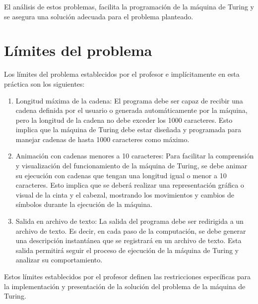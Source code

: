 El análisis de estos problemas, facilita la programación de la máquina de Turing y se asegura una solución adecuada para el problema planteado. \newline


\section{Límites del problema}%
Los límites del problema establecidos por el profesor e implícitamente en esta práctica son los siguientes:\newline
\begin{enumerate}
    \item Longitud máxima de la cadena: El programa debe ser capaz de recibir una cadena definida por el usuario o generada automáticamente por la máquina, pero la longitud de la cadena no debe exceder los 1000 caracteres. Esto implica que la máquina de Turing debe estar diseñada y programada para manejar cadenas de hasta 1000 caracteres como máximo.\newline

    \item Animación con cadenas menores a 10 caracteres: Para facilitar la comprensión y visualización del funcionamiento de la máquina de Turing, se debe animar su ejecución con cadenas que tengan una longitud igual o menor a 10 caracteres. Esto implica que se deberá realizar una representación gráfica o visual de la cinta y el cabezal, mostrando los movimientos y cambios de símbolos durante la ejecución de la máquina.\newline
    
    \item Salida en archivo de texto: La salida del programa debe ser redirigida a un archivo de texto. Es decir, en cada paso de la computación, se debe generar una descripción instantánea que se registrará en un archivo de texto. Esta salida permitirá seguir el proceso de ejecución de la máquina de Turing y analizar su comportamiento.\newline
    
\end{enumerate}
Estos límites establecidos por el profesor definen las restricciones específicas para la implementación y presentación de la solución del problema de la máquina de Turing.\newline


